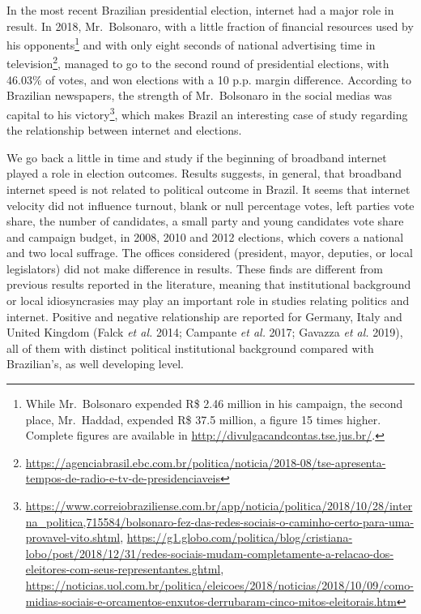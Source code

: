 \documentclass[
  12pt,
]{article}
\begin{document}
In the most recent Brazilian presidential election, internet had a major
role in result. In 2018, Mr.~Bolsonaro, with a little fraction of
financial resources used by his opponents\footnote{While Mr.~Bolsonaro
  expended R\$ 2.46 million in his campaign, the second place,
  Mr.~Haddad, expended R\$ 37.5 million, a figure 15 times higher.
  Complete figures are available in
  \url{http://divulgacandcontas.tse.jus.br/}.} and with only eight
seconds of national advertising time in television\footnote{\url{https://agenciabrasil.ebc.com.br/politica/noticia/2018-08/tse-apresenta-tempos-de-radio-e-tv-de-presidenciaveis}},
managed to go to the second round of presidential elections, with
46.03\% of votes, and won elections with a 10 p.p. margin difference.
According to Brazilian newspapers, the strength of Mr.~Bolsonaro in the
social medias was capital to his victory\footnote{\url{https://www.correiobraziliense.com.br/app/noticia/politica/2018/10/28/interna_politica,715584/bolsonaro-fez-das-redes-sociais-o-caminho-certo-para-uma-provavel-vito.shtml},
  \url{https://g1.globo.com/politica/blog/cristiana-lobo/post/2018/12/31/redes-sociais-mudam-completamente-a-relacao-dos-eleitores-com-seus-representantes.ghtml},
  \url{https://noticias.uol.com.br/politica/eleicoes/2018/noticias/2018/10/09/como-midias-sociais-e-orcamentos-enxutos-derrubaram-cinco-mitos-eleitorais.htm}},
which makes Brazil an interesting case of study regarding the
relationship between internet and elections.

We go back a little in time and study if the beginning of broadband
internet played a role in election outcomes. Results suggests, in
general, that broadband internet speed is not related to political
outcome in Brazil. It seems that internet velocity did not influence
turnout, blank or null percentage votes, left parties vote share, the
number of candidates, a small party and young candidates vote share and
campaign budget, in 2008, 2010 and 2012 elections, which covers a
national and two local suffrage. The offices considered (president,
mayor, deputies, or local legislators) did not make difference in
results. These finds are different from previous results reported in the
literature, meaning that institutional background or local
idiosyncrasies may play an important role in studies relating politics
and internet. Positive and negative relationship are reported for
Germany, Italy and United Kingdom (Falck \emph{et al.} 2014; Campante
\emph{et al.} 2017; Gavazza \emph{et al.} 2019), all of them with
distinct political institutional background compared with Brazilian's,
as well developing level.
\end{document}
